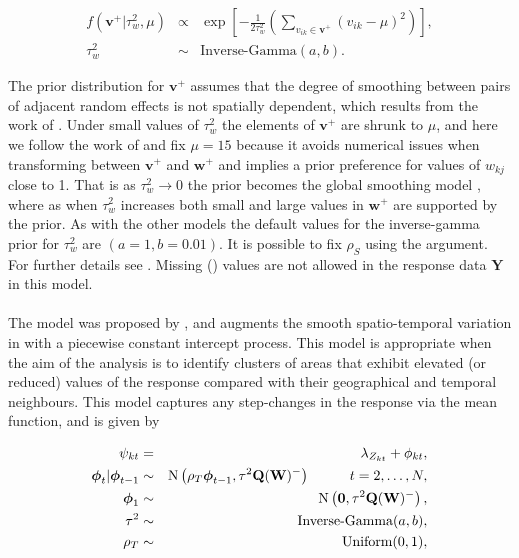 \documentclass[article, nojss]{jss}
\newcommand{\bd}[1]{\ensuremath{\mbox{\boldmath $#1$}}}
\begin{document}
\begin{eqnarray}
f(\mathbf{v}^{+}|\tau^2_w, \mu) & \propto & \exp\left[-\frac{1}{2\tau^2_w}\left(\sum_{v_{ik}\in\mathbf{v}^{+}}(v_{ik} - \mu)^2\right)\right], \label{caradaptive2}\\
\tau^{2}_w&\sim&\mbox{Inverse-Gamma}(a, b).\nonumber
\end{eqnarray}

The prior distribution for $\mathbf{v}^+$ assumes that the degree of smoothing between pairs of adjacent random effects is not spatially dependent, which results from the  work of \cite{rushworth2016}. Under small values of $\tau_w^2$ the elements of  $\mathbf{v}^+$ are shrunk to $\mu$, and here we follow the work of \cite{rushworth2016} and fix $\mu=15$ because it avoids numerical issues when transforming between $\mathbf{v}^+$ and $\mathbf{w}^+$ and implies a prior preference for values of $w_{kj}$ close to 1.  That is as $\tau^2_w \rightarrow 0$ the prior becomes the global smoothing model , where as when $\tau^{2}_{w}$ increases both small and large values in $\mathbf{w}^{+}$ are supported by the prior. As with the other models the default values for the inverse-gamma prior for $\tau_w^2$ are $(a=1, b=0.01)$. It is possible to fix $\rho_S$ using the  argument. For further details see \cite{rushworth2016}. Missing () values are not allowed in the response data $\mathbf{Y}$ in this model.\\


\\
The model was proposed by \cite{lee2016}, and augments the smooth spatio-temporal variation in  with a piecewise constant intercept process.  This model is appropriate when the aim of the analysis is to identify clusters of areas that exhibit elevated (or reduced) values of the response compared with their geographical and temporal neighbours. This model captures any step-changes in the response via the mean function, and is given by


\begin{eqnarray}
\psi_{kt}&=&\lambda_{Z_{kt}} + \phi_{kt},\label{carcluster1}\\
\bd{\phi}_t|\bd{\phi}_{t-1} & \sim & \mbox{N}\left(\rho_T\bd{\phi}_{t-1}, \tau^{2} \mathbf{Q}(\mathbf{W})^{-}\right)\hspace{1cm} t=2,\ldots,N,\nonumber\\
\bd{\phi}_1 & \sim & \mbox{N}\left(\mathbf{0}, \tau^{2} \mathbf{Q}(\mathbf{W})^{-}\right),\nonumber\\
\tau^2&\sim&\mbox{Inverse-Gamma}(a,b),\nonumber\\
\rho_T&\sim&\mbox{Uniform}(0,1),\nonumber
\end{eqnarray}
\end{document}

